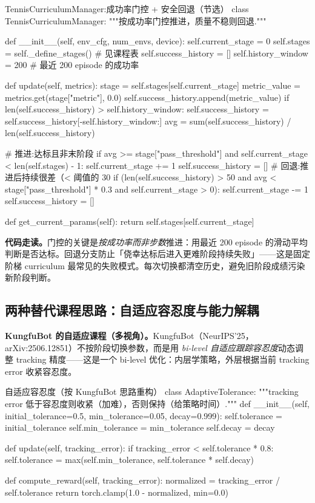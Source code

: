 \begin{codebox}[Python]{TennisCurriculumManager:成功率门控 + 安全回退（节选）}
class TennisCurriculumManager:
    """按成功率门控推进，质量不稳则回退."""

    def __init__(self, env_cfg, num_envs, device):
        self.current_stage = 0
        self.stages = self._define_stages()   # 见课程表
        self.success_history = []
        self.history_window = 200             # 最近 200 episode 的成功率

    def update(self, metrics):
        stage = self.stages[self.current_stage]
        metric_value = metrics.get(stage["metric"], 0.0)
        self.success_history.append(metric_value)
        if len(self.success_history) > self.history_window:
            self.success_history = self.success_history[-self.history_window:]
        avg = sum(self.success_history) / len(self.success_history)

        # 推进:达标且非末阶段
        if avg >= stage["pass_threshold"] and self.current_stage < len(self.stages) - 1:
            self.current_stage += 1
            self.success_history = []
        # 回退:推进后持续很差（< 阈值的 30%
        if (len(self.success_history) > 50 and
                avg < stage["pass_threshold"] * 0.3 and self.current_stage > 0):
            self.current_stage -= 1
            self.success_history = []

    def get_current_params(self):
        return self.stages[self.current_stage]
\end{codebox}

\textbf{代码走读。}门控的关键是\emph{按成功率而非步数}推进：用最近 200 episode 的滑动平均判断是否达标。回退分支防止「侥幸达标后进入更难阶段持续失败」——这是固定阶梯 curriculum 最常见的失败模式。每次切换都清空历史，避免旧阶段成绩污染新阶段判断。

\subsection{两种替代课程思路：自适应容忍度与能力解耦}

\textbf{KungfuBot 的自适应课程（多视角）。}KungfuBot（NeurIPS'25，arXiv:2506.12851）不按阶段切换参数，而是用 \emph{bi-level 自适应跟踪容忍度}动态调整 tracking 精度——这是一个 bi-level 优化：内层学策略，外层根据当前 tracking error 收紧容忍度。

\begin{codebox}[Python]{自适应容忍度（按 KungfuBot 思路重构）}
class AdaptiveTolerance:
    """tracking error 低于容忍度则收紧（加难），否则保持（给策略时间）."""
    def __init__(self, initial_tolerance=0.5, min_tolerance=0.05, decay=0.999):
        self.tolerance = initial_tolerance
        self.min_tolerance = min_tolerance
        self.decay = decay

    def update(self, tracking_error):
        if tracking_error < self.tolerance * 0.8:
            self.tolerance = max(self.min_tolerance, self.tolerance * self.decay)

    def compute_reward(self, tracking_error):
        normalized = tracking_error / self.tolerance
        return torch.clamp(1.0 - normalized, min=0.0)
\end{codebox}

